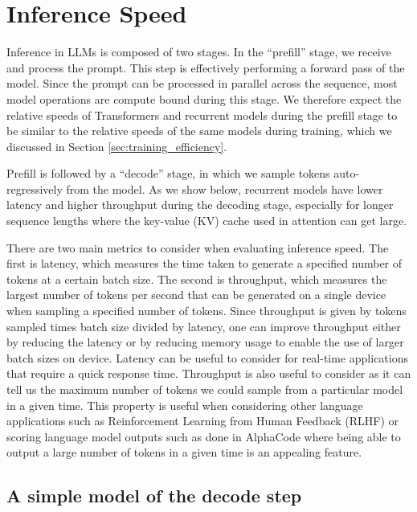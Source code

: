 \documentclass[11pt, a4paper, logo, onecolumn]{googledeepmind}
\theoremstyle{definition}
\begin{document}
\section{Inference Speed}
\label{sec:inference}








Inference in LLMs is composed of two stages. In the ``prefill'' stage, we receive and process the prompt. This step is effectively performing a forward pass of the model. 
Since the prompt can be processed in parallel across the sequence, most model operations are compute bound during this stage. 
We therefore expect the relative speeds of Transformers and recurrent models during the prefill stage to be similar to the relative speeds of the same models during training, which we discussed in Section \ref{sec:training_efficiency}. 

Prefill is followed by a ``decode'' stage, in which we sample tokens auto-regressively from the model. As we show below, recurrent models have lower latency and higher throughput during the decoding stage, especially for longer sequence lengths where the key-value (KV) cache used in attention can get large.

There are two main metrics to consider when evaluating inference speed. 
The first is latency, which measures the time taken to generate a specified number of tokens at a certain batch size. 
The second is throughput, which measures the largest number of tokens per second that can be generated on a single device when sampling a specified number of tokens. Since throughput is given by tokens sampled times batch size divided by latency, one can improve throughput either by reducing the latency or by reducing memory usage to enable the use of larger batch sizes on device. Latency can be useful to consider for real-time applications that require a quick response time. Throughput is also useful to consider as it can tell us the maximum number of tokens we could sample from a particular model in a given time. This property is useful when considering other language applications such as Reinforcement Learning from Human Feedback (RLHF) or scoring language model outputs such as done in AlphaCode \citep{li2022competition} where being able to output a large number of tokens in a given time is an appealing feature.


\subsection{A simple model of the decode step}
\end{document}
